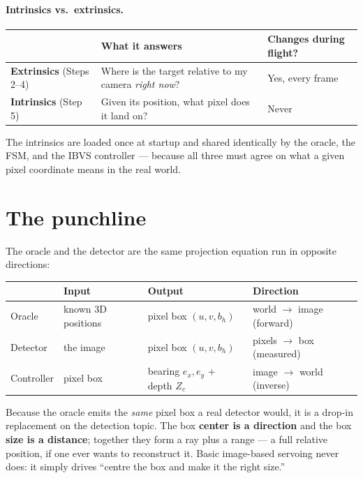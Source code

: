 \documentclass[11pt]{article}
\begin{document}
\paragraph{Intrinsics vs.\ extrinsics.}

\begin{center}
\begin{tabular}{@{}lll@{}}
\toprule
 & What it answers & Changes during flight? \\
\midrule
\textbf{Extrinsics} (Steps 2--4) & Where is the target relative to my camera \emph{right now}? & Yes, every frame \\
\textbf{Intrinsics} (Step 5)     & Given its position, what pixel does it land on?              & Never \\
\bottomrule
\end{tabular}
\end{center}

\noindent
The intrinsics are loaded once at startup and shared identically by the oracle,
the FSM, and the IBVS controller --- because all three must agree on what a
given pixel coordinate means in the real world.

\section{The punchline}

The oracle and the detector are the same projection equation run in opposite
directions:

\begin{center}
\begin{tabular}{@{}llll@{}}
\toprule
 & Input & Output & Direction \\
\midrule
Oracle      & known 3D positions & pixel box $(u,v,b_h)$ & world $\to$ image (forward) \\
Detector    & the image          & pixel box $(u,v,b_h)$ & pixels $\to$ box (measured) \\
Controller  & pixel box          & bearing $e_x,e_y$ + depth $Z_c$ & image $\to$ world (inverse) \\
\bottomrule
\end{tabular}
\end{center}

\noindent
Because the oracle emits the \emph{same} pixel box a real detector would, it is a
drop-in replacement on the detection topic. The box \textbf{center is a
direction} and the box \textbf{size is a distance}; together they form a ray plus
a range --- a full relative position, if one ever wants to reconstruct it. Basic
image-based servoing never does: it simply drives ``centre the box and make it
the right size.''
\end{document}
